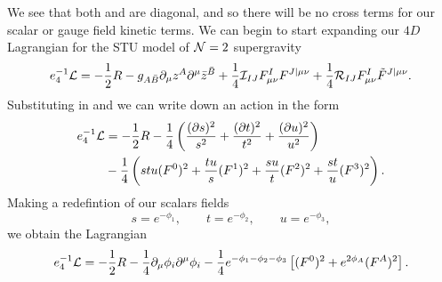 We see that both  and  are diagonal, and so there will be no cross terms for our scalar or gauge field kinetic terms. We can begin to start expanding our $4D$ Lagrangian  for the STU model of ${\cal N}=2$ supergravity
\begin{equation*}
  e_4^{-1} {\cal L} = -\frac{1}{2}R - g_{A\bar{B}} \partial_\mu z^A \partial^\mu \bar{z}^{\bar{B}} + \frac{1}{4} {\cal I}_{IJ} F^I_{\mu \nu} F^{J|\mu \nu}  + \frac{1}{4} {\cal R}_{IJ} F^I_{\mu \nu} \tilde{F}^{J|\mu \nu} .
\end{equation*}
Substituting in  and  we can write down an action in the form
\begin{equation*}
\begin{aligned}
    e_4^{-1} {\cal L} &= -\frac{1}{2}R - \frac{1}{4} \left( \frac{(\partial s)^2}{s^2} + \frac{(\partial t)^2}{t^2} + \frac{(\partial u)^2}{u^2} \right)  \\
    &- \frac{1}{4} \left(  stu (F^0)^2 + \frac{tu}{s} (F^1)^2 + \frac{su}{t} (F^2)^2 + \frac{st}{u} (F^3)^2   \right).
\end{aligned}
\end{equation*}
Making a redefintion of our scalars fields
\begin{equation*}
    s = e^{-\phi_1}, \qquad t = e^{-\phi_2}, \qquad u = e^{-\phi_3},
\end{equation*}
we obtain the Lagrangian
\begin{equation*}
   \begin{aligned}
 e_4^{-1} {\cal L} = -\frac{1}{2}R - \frac{1}{4} \partial_\mu \phi_i \partial^\mu \phi_i
 - \frac{1}{4} e^{-\phi_1 - \phi_2 - \phi_3} \left[ (F^0)^2 + e^{2 \phi_A } (F^A)^2 \right].
   \end{aligned}
\end{equation*}